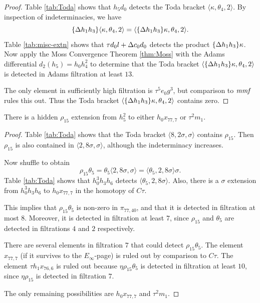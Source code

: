 \begin{proof}
Table \ref{tab:Toda} shows that $h_5 d_0$ detects the Toda bracket
$\langle \kappa, \theta_4, 2 \rangle$.  By inspection of 
indeterminacies, we have
\[
\{\Delta h_1 h_3\} \langle \kappa, \theta_4, 2 \rangle =
\langle \{\Delta h_1 h_3\} \kappa, \theta_4, 2 \rangle.
\]
Table \ref{tab:misc-extn} shows that
$\tau d_0 l + \Delta c_0 d_0$ detects the product
$\{\Delta h_1 h_3 \} \kappa$.
Now apply the Moss Convergence Theorem \ref{thm:Moss}
with the Adams differential $d_2(h_5) = h_0 h_4^2$
to determine that the Toda bracket
$\langle \{\Delta h_1 h_3\} \kappa, \theta_4, 2 \rangle$ is 
detected in Adams filtration at least $13$.

The only element in sufficiently high filtration is $\tau^5 e_0 g^3$,
but comparison to $\textit{mmf}$ rules this out.
Thus the Toda bracket
$\langle \{\Delta h_1 h_3\} \kappa, \theta_4, 2 \rangle$ 
contains zero.
\end{proof}

\begin{lemma}
\label{lem:rho15-h5^2}
There is a hidden $\rho_{15}$ extension from $h_5^2$ to
either $h_0 x_{77,7}$ or $\tau^2 m_1$.
\end{lemma}

\begin{proof}
Table \ref{tab:Toda} shows that the Toda bracket
$\langle 8, 2 \sigma, \sigma \rangle$ contains
$\rho_{15}$.
Then $\rho_{15}$ is also contained in 
$\langle 2, 8 \sigma, \sigma \rangle$, although the indeterminacy
increases.

Now shuffle to obtain
\[
\rho_{15} \theta_5 = \theta_5 \langle 2, 8\sigma, \sigma \rangle =
\langle \theta_5, 2, 8 \sigma \rangle \sigma.
\]
Table \ref{tab:Toda} shows that $h_0^3 h_3 h_6$
detects $\langle \theta_5, 2, 8\sigma \rangle$.
Also, there is a $\sigma$ extension from $h_0^3 h_3 h_6$
to $h_0 x_{77,7}$ in the homotopy of $C\tau$.

This implies that $\rho_{15} \theta_5$ is non-zero in
$\pi_{77,40}$, and that it is detected in filtration at most $8$.
Moreover, it is detected in filtration at least $7$, since
$\rho_{15}$ and $\theta_5$ are detected in filtrations $4$ and $2$
respectively.

There are several elements
in filtration $7$ that could detect $\rho_{15} \theta_5$.
The element $x_{77,7}$ (if it survives to the $E_\infty$-page)
is ruled out by comparison to $C\tau$.
The element $\tau h_1 x_{76,6}$ is ruled out because
$\eta \rho_{15} \theta_5$ is detected in filtration at least $10$,
since $\eta \rho_{15}$ is detected in filtration $7$.

The only remaining possibilities are $h_0 x_{77,7}$
and $\tau^2 m_1$.
\end{proof}

